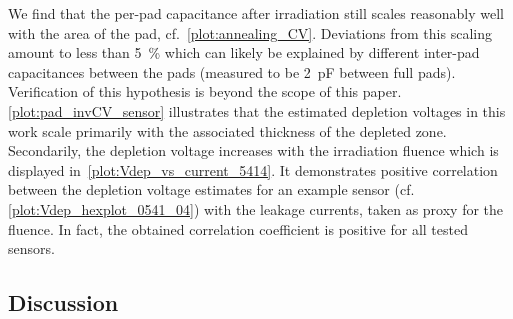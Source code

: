 We find that the per-pad capacitance after irradiation still scales reasonably well with the area of the pad, cf.~\ref{plot:annealing_CV}.
Deviations from this scaling amount to less than \SI{5}{\percent} which can likely be explained by different inter-pad capacitances between the pads (measured to be \SI{2}{\pico\farad} between full pads).
Verification of this hypothesis is beyond the scope of this paper. 
\ref{plot:pad_invCV_sensor} illustrates that the estimated depletion voltages in this work scale primarily with the associated thickness of the depleted zone. 
Secondarily, the depletion voltage increases with the irradiation fluence which is displayed in~\ref{plot:Vdep_vs_current_5414}.
It demonstrates positive correlation between the depletion voltage estimates for an example sensor (cf. \ref{plot:Vdep_hexplot_0541_04}) with the leakage currents, taken as proxy for the fluence.
In fact, the obtained correlation coefficient is positive for all tested sensors.

\subsection{Discussion}
\label{subsec:discussion}